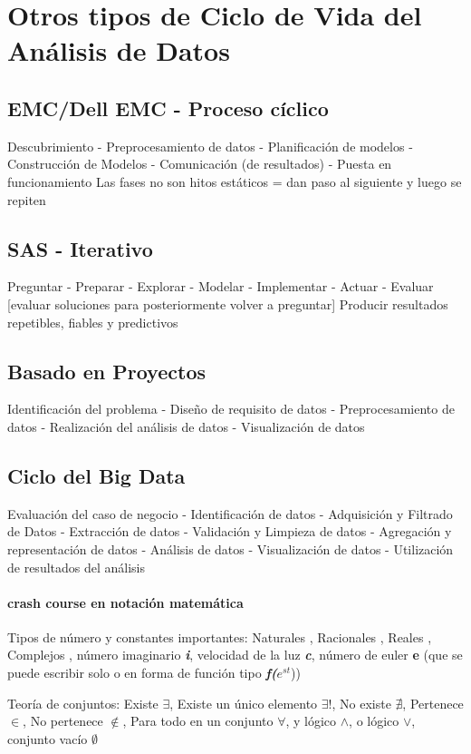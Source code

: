 \section{Otros tipos de Ciclo de Vida del Análisis de Datos}
\subsection{EMC/Dell EMC - Proceso cíclico}
Descubrimiento - Preprocesamiento de datos - Planificación de modelos - Construcción de Modelos - Comunicación (de resultados) - Puesta en funcionamiento
Las fases no son hitos estáticos = dan paso al siguiente y luego se repiten

\subsection{SAS - Iterativo}
Preguntar - Preparar - Explorar - Modelar - Implementar - Actuar - Evaluar [evaluar soluciones para posteriormente volver a preguntar]
Producir resultados repetibles, fiables y predictivos

\subsection{Basado en Proyectos}
Identificación del problema - Diseño de requisito de datos - Preprocesamiento de datos - Realización del análisis de datos - Visualización de datos 

\subsection{Ciclo del Big Data}
Evaluación del caso de negocio - Identificación de datos - Adquisición y Filtrado de Datos - Extracción de datos - Validación y Limpieza de datos - Agregación y representación de datos - Análisis de datos - Visualización de datos - Utilización de resultados del análisis
\newpage

\paragraph{crash course en notación matemática}

Tipos de número y constantes importantes: Naturales \N, Racionales \Q, Reales \R, Complejos \C, número imaginario \textit{\textbf{i}}, velocidad de la luz \textbf{\textit{c}}, número de euler \textbf{e} (que se puede escribir solo o en forma de función tipo \textbf{\textit{f(}\(e^{st}\)}))

 
Teoría de conjuntos: Existe \(\exists\), Existe un único elemento \(\exists!\), No existe \(\nexists\), Pertenece \(\in\), No pertenece \(\notin\), Para todo en un conjunto \(\forall\), y lógico \(\land\), o lógico \(\lor\), conjunto vacío \(\emptyset\)

